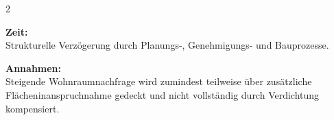 \documentclass[10pt, a4paper]{article}
\begin{document}
\begin{multicols}{2}
\begin{minipage}{\linewidth}
\textbf{Zeit:}\\
Strukturelle Verzögerung durch Planungs-, Genehmigungs- und Bauprozesse.

\textbf{Annahmen:}\\
Steigende Wohnraumnachfrage wird zumindest teilweise über zusätzliche Flächeninanspruchnahme gedeckt und nicht vollständig durch Verdichtung kompensiert.
\end{minipage}\vspace{1em}

\end{multicols}
\end{document}
